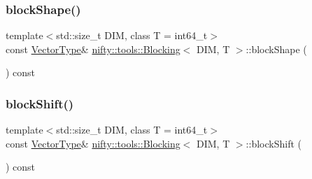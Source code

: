 \mbox{\label{classnifty_1_1tools_1_1Blocking_aa42bfae6940045db062898f66345897b}} 
\subsubsection{\texorpdfstring{block\+Shape()}{blockShape()}}
{\footnotesize\ttfamily template$<$std\+::size\+\_\+t D\+IM, class T  = int64\+\_\+t$>$ \\
const \hyperlink{classnifty_1_1tools_1_1Blocking_a5f8df3d4cdf09803217d729a04018fb3}{Vector\+Type}\& \hyperlink{classnifty_1_1tools_1_1Blocking}{nifty\+::tools\+::\+Blocking}$<$ D\+IM, T $>$\+::block\+Shape (\begin{DoxyParamCaption}{ }\end{DoxyParamCaption}) const\hspace{0.3cm}{\ttfamily [inline]}}

\mbox{\label{classnifty_1_1tools_1_1Blocking_a7efe756ab0f686e2edb39fb800cea37f}} 
\subsubsection{\texorpdfstring{block\+Shift()}{blockShift()}}
{\footnotesize\ttfamily template$<$std\+::size\+\_\+t D\+IM, class T  = int64\+\_\+t$>$ \\
const \hyperlink{classnifty_1_1tools_1_1Blocking_a5f8df3d4cdf09803217d729a04018fb3}{Vector\+Type}\& \hyperlink{classnifty_1_1tools_1_1Blocking}{nifty\+::tools\+::\+Blocking}$<$ D\+IM, T $>$\+::block\+Shift (\begin{DoxyParamCaption}{ }\end{DoxyParamCaption}) const\hspace{0.3cm}{\ttfamily [inline]}}

\mbox{\label{classnifty_1_1tools_1_1Blocking_ad736ea915574470bc35e35df5a11a9f3}} 
